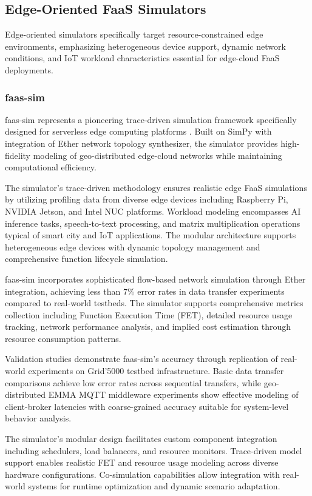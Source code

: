 \subsection{Edge-Oriented FaaS Simulators}

Edge-oriented simulators specifically target resource-constrained edge environments, emphasizing heterogeneous device support, dynamic network conditions, and IoT workload characteristics essential for edge-cloud FaaS deployments.

\subsubsection{faas-sim}

faas-sim represents a pioneering trace-driven simulation framework specifically designed for serverless edge computing platforms \cite{boughzala2022faassim}. Built on SimPy with integration of Ether network topology synthesizer, the simulator provides high-fidelity modeling of geo-distributed edge-cloud networks while maintaining computational efficiency.

The simulator's trace-driven methodology ensures realistic edge FaaS simulations by utilizing profiling data from diverse edge devices including Raspberry Pi, NVIDIA Jetson, and Intel NUC platforms. Workload modeling encompasses AI inference tasks, speech-to-text processing, and matrix multiplication operations typical of smart city and IoT applications. The modular architecture supports heterogeneous edge devices with dynamic topology management and comprehensive function lifecycle simulation.

faas-sim incorporates sophisticated flow-based network simulation through Ether integration, achieving less than 7\% error rates in data transfer experiments compared to real-world testbeds. The simulator supports comprehensive metrics collection including Function Execution Time (FET), detailed resource usage tracking, network performance analysis, and implied cost estimation through resource consumption patterns.

Validation studies demonstrate faas-sim's accuracy through replication of real-world experiments on Grid'5000 testbed infrastructure. Basic data transfer comparisons achieve low error rates across sequential transfers, while geo-distributed EMMA MQTT middleware experiments show effective modeling of client-broker latencies with coarse-grained accuracy suitable for system-level behavior analysis.

The simulator's modular design facilitates custom component integration including schedulers, load balancers, and resource monitors. Trace-driven model support enables realistic FET and resource usage modeling across diverse hardware configurations. Co-simulation capabilities allow integration with real-world systems for runtime optimization and dynamic scenario adaptation.

